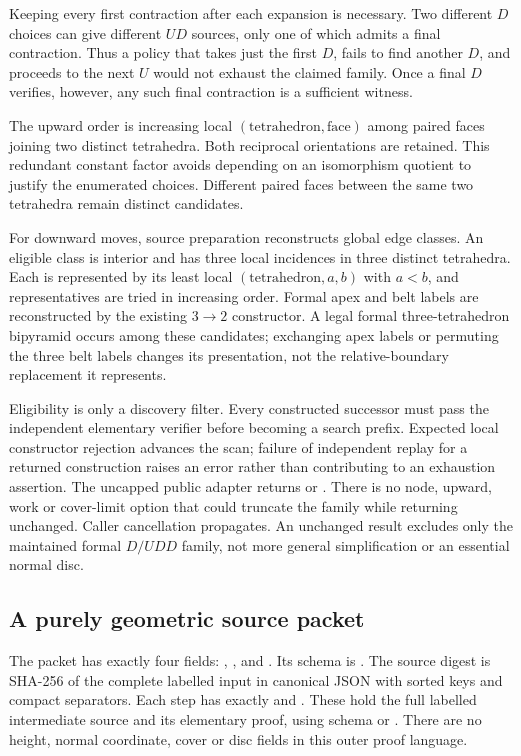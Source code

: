 Keeping every first contraction after each expansion is necessary.
Two different $D$ choices can give different $UD$ sources, only one of
which admits a final contraction.  Thus a policy that takes just the
first $D$, fails to find another $D$, and proceeds to the next $U$
would not exhaust the claimed family.  Once a final $D$ verifies,
however, any such final contraction is a sufficient witness.

The upward order is increasing local $(\text{tetrahedron},\text{face})$
among paired faces joining two distinct tetrahedra.  Both reciprocal
orientations are retained.  This redundant constant factor avoids
depending on an isomorphism quotient to justify the enumerated choices.
Different paired faces between the same two tetrahedra remain distinct
candidates.

For downward moves, source preparation reconstructs global edge classes.
An eligible class is interior and has three local incidences in three
distinct tetrahedra.  Each is represented by its least local
$(\text{tetrahedron},a,b)$ with $a<b$, and representatives are tried
in increasing order.  Formal apex and belt labels are reconstructed
by the existing $3\to2$ constructor.  A legal formal three-tetrahedron
bipyramid occurs among these candidates; exchanging apex labels or
permuting the three belt labels changes its presentation, not the
relative-boundary replacement it represents.

Eligibility is only a discovery filter.  Every constructed successor
must pass the independent elementary verifier before becoming a search
prefix.  Expected local constructor rejection advances the scan;
failure of independent replay for a returned construction raises an
error rather than contributing to an exhaustion assertion.  The
uncapped public adapter returns  or .
There is no node, upward, work or cover-limit option that could truncate
the family while returning unchanged.  Caller cancellation propagates.
An unchanged result excludes only the maintained formal $D/UDD$ family,
not more general simplification or an essential normal disc.

\subsection{A purely geometric source packet}

The packet has exactly four fields: ,
,  and .
Its schema is .  The source digest
is SHA-256 of the complete labelled input in canonical JSON with sorted
keys and compact separators.  Each step has exactly
 and .  These hold the full
labelled intermediate source and its elementary proof, using schema
 or .  There are no height, normal
coordinate, cover or disc fields in this outer proof language.


